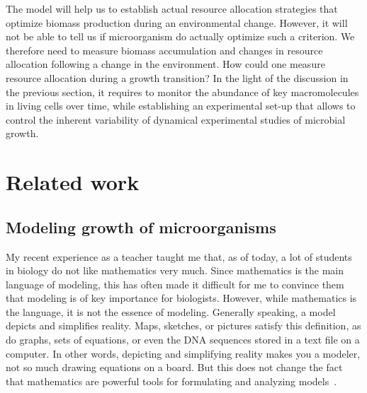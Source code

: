 The model will help us to establish actual resource allocation strategies that optimize biomass production during an environmental change.
However, it will not be able to tell us if microorganism do actually optimize such a criterion.
We therefore need to measure biomass accumulation and changes in resource allocation following a change in the environment.
How could one measure resource allocation during a growth transition?
In the light of the discussion in the previous section, it requires to monitor the abundance of key macromolecules in living cells over time, while establishing an experimental set-up that allows to control the inherent variability of dynamical experimental studies of microbial growth.

\section{Related work}

\subsection{Modeling growth of microorganisms}

My recent experience as a teacher taught me that, as of today, a lot of students in biology do not like mathematics very much.
Since mathematics is the main language of modeling, this has often made it difficult for me to convince them that modeling is of key importance for biologists.
However, while mathematics is the language, it is not the essence of modeling.
Generally speaking, a model depicts and simplifies reality.
Maps, sketches, or pictures satisfy this definition, as do graphs, sets of equations, or even the DNA sequences stored in a text file on a computer.
In other words, depicting and simplifying reality makes you a modeler, not so much drawing equations on a board.
But this does not change the fact that mathematics are powerful tools for formulating and analyzing models~\cite{servedio_not_2014,mcgill_calm_2013}.

